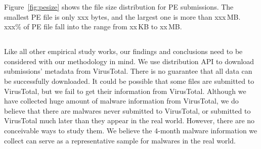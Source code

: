 

Figure~\ref{fig:pesize} shows the file size distribution for PE submissions. 
The smallest PE file is only xxx bytes, and the largest one is more than xxx\,MB. 
xxx\% of PE file fall into the range from xx\,KB to xx\,MB. 

\subsection{}

Like all other empirical study works, 
our findings and conclusions need to be considered with our methodology in mind. 
We use distribution API to download submissions' metadata from VirusTotal. 
There is no guarantee that all data can be successfully downloaded. 
It could be possible that some files are submitted to VirusTotal, 
but we fail to get their information from VirusTotal.
Although we have collected huge amount of malware information from VirusTotal,
we do believe that there are malwares never submitted to VirusTotal, 
or submitted to VirusTotal much later than they appear in the real world. 
However, there are no conceivable ways to study them.
We believe the 4-month malware information we collect can serve as a representative sample for malwares in the real world. 
